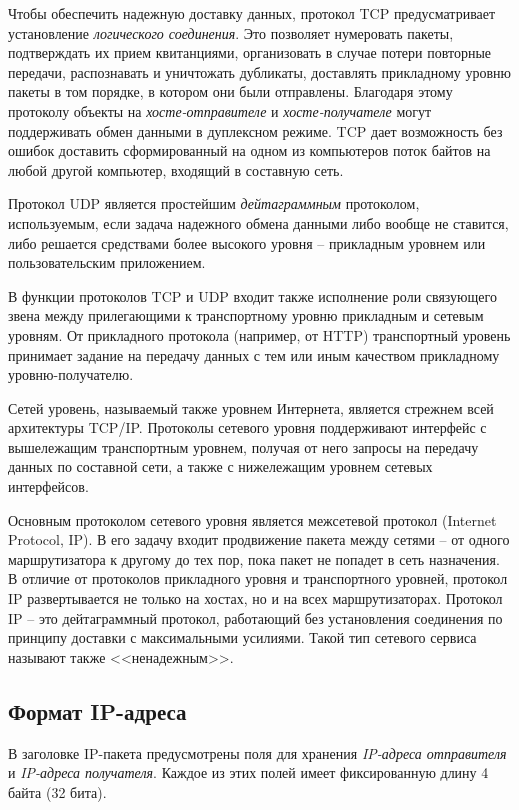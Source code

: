 \documentclass[%
	11pt,
	a4paper,
	utf8,
		]{article}
\begin{document}
Чтобы обеспечить надежную доставку данных, протокол TCP предусматривает установление \emph{логического соединения}. Это позволяет нумеровать пакеты, подтверждать их прием квитанциями, организовать в случае потери повторные передачи, распознавать и уничтожать дубликаты, доставлять прикладному уровню пакеты в том порядке, в котором они были отправлены. Благодаря этому протоколу объекты на \emph{хосте-отправителе} и \emph{хосте-получателе} могут поддерживать обмен данными в дуплексном режиме. TCP дает возможность без ошибок доставить сформированный на одном из компьютеров поток байтов на любой другой компьютер, входящий в составную сеть.

Протокол UDP является простейшим \emph{дейтаграммным} протоколом, используемым, если задача надежного обмена данными либо вообще не ставится, либо решается средствами более высокого уровня -- прикладным уровнем или пользовательским приложением.

В функции протоколов TCP и UDP входит также исполнение роли связующего звена между прилегающими к транспортному уровню прикладным и сетевым уровням. От прикладного протокола (например, от HTTP) транспортный уровень принимает задание на передачу данных с тем или иным качеством прикладному уровню-получателю.

Сетей уровень, называемый также уровнем Интернета, является стрежнем всей архитектуры TCP/IP. Протоколы сетевого уровня поддерживают интерфейс с вышележащим транспортным уровнем, получая от него запросы на передачу данных по составной сети, а также с нижележащим уровнем сетевых интерфейсов.

Основным протоколом сетевого уровня является межсетевой протокол (Internet Protocol, IP). В его задачу входит продвижение пакета между сетями -- от одного маршрутизатора к другому до тех пор, пока пакет не попадет в сеть назначения. В отличие от протоколов прикладного уровня и транспортного уровней, протокол IP развертывается не только на хостах, но и на всех маршрутизаторах. Протокол IP -- это дейтаграммный протокол, работающий без установления соединения по принципу доставки с максимальными усилиями. Такой тип сетевого сервиса называют также <<ненадежным>>.

\subsection{Формат IP-адреса}

В заголовке IP-пакета предусмотрены поля для хранения \emph{IP-адреса отправителя} и \emph{IP-адреса получателя}. Каждое из этих полей имеет фиксированную длину 4 байта (32 бита).
\end{document}
